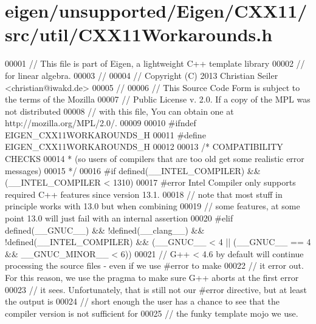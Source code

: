 \hypertarget{eigen_2unsupported_2_eigen_2_c_x_x11_2src_2util_2_c_x_x11_workarounds_8h_source}{}\section{eigen/unsupported/\+Eigen/\+C\+X\+X11/src/util/\+C\+X\+X11\+Workarounds.h}
\label{eigen_2unsupported_2_eigen_2_c_x_x11_2src_2util_2_c_x_x11_workarounds_8h_source}

\begin{DoxyCode}
00001 \textcolor{comment}{// This file is part of Eigen, a lightweight C++ template library}
00002 \textcolor{comment}{// for linear algebra.}
00003 \textcolor{comment}{//}
00004 \textcolor{comment}{// Copyright (C) 2013 Christian Seiler <christian@iwakd.de>}
00005 \textcolor{comment}{//}
00006 \textcolor{comment}{// This Source Code Form is subject to the terms of the Mozilla}
00007 \textcolor{comment}{// Public License v. 2.0. If a copy of the MPL was not distributed}
00008 \textcolor{comment}{// with this file, You can obtain one at http://mozilla.org/MPL/2.0/.}
00009 
00010 \textcolor{preprocessor}{#ifndef EIGEN\_CXX11WORKAROUNDS\_H}
00011 \textcolor{preprocessor}{#define EIGEN\_CXX11WORKAROUNDS\_H}
00012 
00013 \textcolor{comment}{/* COMPATIBILITY CHECKS}
00014 \textcolor{comment}{ * (so users of compilers that are too old get some realistic error messages)}
00015 \textcolor{comment}{ */}
00016 \textcolor{preprocessor}{#if defined(\_\_INTEL\_COMPILER) && (\_\_INTEL\_COMPILER < 1310)}
00017 \textcolor{preprocessor}{#error Intel Compiler only supports required C++ features since version 13.1.}
00018 \textcolor{comment}{// note that most stuff in principle works with 13.0 but when combining}
00019 \textcolor{comment}{// some features, at some point 13.0 will just fail with an internal assertion}
00020 \textcolor{preprocessor}{#elif defined(\_\_GNUC\_\_) && !defined(\_\_clang\_\_) && !defined(\_\_INTEL\_COMPILER) && (\_\_GNUC\_\_ < 4 || (\_\_GNUC\_\_
       == 4 && \_\_GNUC\_MINOR\_\_ < 6))}
00021 \textcolor{comment}{// G++ < 4.6 by default will continue processing the source files - even if we use #error to make}
00022 \textcolor{comment}{// it error out. For this reason, we use the pragma to make sure G++ aborts at the first error}
00023 \textcolor{comment}{// it sees. Unfortunately, that is still not our #error directive, but at least the output is}
00024 \textcolor{comment}{// short enough the user has a chance to see that the compiler version is not sufficient for}
00025 \textcolor{comment}{// the funky template mojo we use.}

\end{DoxyCode}
